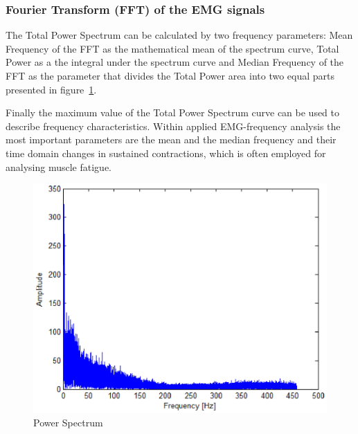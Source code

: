 \documentclass[conference]{IEEEtran}
\begin{document}
\subsubsection{Fourier Transform (FFT) of the EMG signals} \label{sub:FourierTransform(FFT)oftheEMGsignals}
\par The Total Power Spectrum can be calculated by two frequency parameters: Mean Frequency of the FFT as the mathematical mean of the spectrum curve, Total Power as a the integral under the spectrum curve and Median Frequency of the FFT as the parameter that divides the Total Power area into two equal parts~\cite{Konrad} presented in figure~\ref{fig:spectre}. \par
Finally the maximum value of the Total Power Spectrum curve can be used to describe frequency characteristics. Within applied EMG-frequency analysis the most important parameters are the mean and the median frequency and their time domain changes in sustained contractions, which is often employed for analysing muscle fatigue.\par

\begin{figure}
    \hspace*{1.2 cm}
    \includegraphics[scale=0.40]{Figures/fig4.eps}
    \caption{Power Spectrum}
    \label{fig:spectre}
\end{figure}
\end{document}
